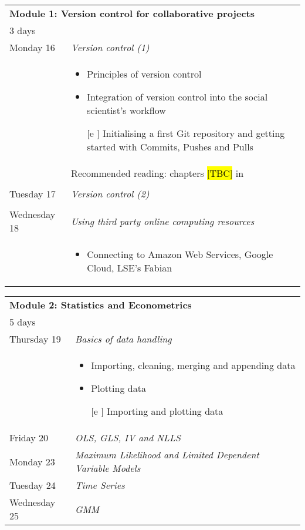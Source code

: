 \documentclass{amsart}
\theoremstyle{definition}
\theoremstyle{remark}
\numberwithin{equation}{section}
\begin{document}
\begin{center}
    \begin{tabular}{| p{3cm} | p{12cm} |}
    \hline
    \multicolumn{2}{|l|}{\textbf{Module 1: Version control for collaborative projects}} \\
    \multicolumn{2}{|l|}{3 days} \\
    \hline
       Monday 16  & \textit{Version control (1)} \\
            & \begin{itemize}
                \item Principles of version control
                \item Integration of version control into the social scientist's workflow
                \item [[e]] Initialising a first Git repository and getting started with Commits, Pushes and Pulls
            \end{itemize}
            \\
            & Recommended reading: chapters \hl{[TBC]} in \cite{gentzkow2014code} \\
            & \\
       Tuesday 17  & \textit{Version control (2)} \\
            & \\
       Wednesday 18 & \textit{Using third party online computing resources} \\
            & \begin{itemize}
                \item Connecting to Amazon Web Services, Google Cloud, LSE's Fabian
            \end{itemize}
            \\
    \hline
    \end{tabular}
\end{center}

\begin{center}
        \begin{tabular}{| p{3cm} | p{12cm} |}
    \hline
    \multicolumn{2}{|l|}{\textbf{Module 2: Statistics and Econometrics}} \\
    \multicolumn{2}{|l|}{5 days} \\
    \hline
    Thursday 19 & \textit{Basics of data handling} \\
        & \begin{itemize}
                \item Importing, cleaning, merging and appending data
                \item Plotting data
                \item [[e]] Importing and plotting data
            \end{itemize}
            \\
    Friday 20 & \textit{OLS, GLS, IV and NLLS}\\
    Monday 23 & \textit{Maximum Likelihood and Limited Dependent Variable Models}\\
    Tuesday 24 & \textit{Time Series}\\
    Wednesday 25 & \textit{GMM} \\
\hline
    \end{tabular}
\end{center}
\end{document}
